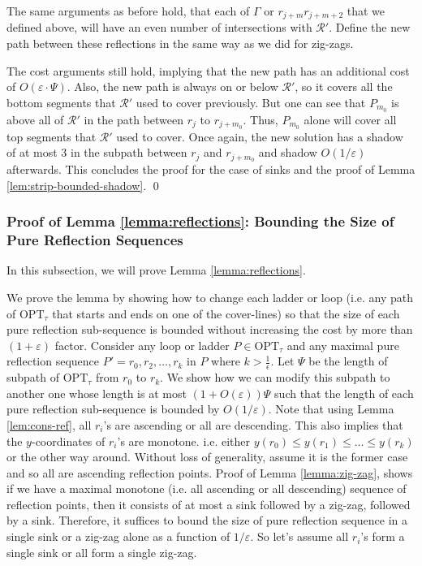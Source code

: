 \documentclass[10pt,a4paper]{amsart}
\theoremstyle{thmstyleone}
\newcommand{\eps}{\varepsilon}
\newcommand{\OPT}{{\text{OPT}}}
\begin{document}
    The same arguments as before hold, that each of $\Gamma$ or $r_{j+m}\left. r_{j + m + 2}\right.$ that we defined above, will have an even number of intersections with $\mathcal R'$. Define the new path between these reflections in
    the same way as we did for zig-zags.
	
    The cost arguments still hold, implying that the new path has an additional cost of $O(\eps\cdot\Psi)$. Also, the new path is always on or below $\mathcal R'$, so it covers all the bottom segments that $\mathcal R'$ used to cover previously. But one can see that $P_{m_0}$ is above all of $\mathcal R'$ in the path between $r_{j}$ to $r_{j + m_0}$. Thus, $P_{m_0}$ alone will cover all top segments that $\mathcal R'$ used to cover. Once again, the new solution has a shadow of at most $3$ in the subpath between $r_j$ and $r_{j+m_0}$ and shadow $O(1/\eps)$ afterwards.
    This concludes the proof for the case of sinks and the proof of 
    Lemma \ref{lem:strip-bounded-shadow}.
    \qed

\subsubsection{Proof of Lemma \ref{lemma:reflections}: Bounding the Size of Pure Reflection Sequences}\label{sec:lemma-pure-reflection-size}
In this subsection, we will prove Lemma \ref{lemma:reflections}. 

We prove the lemma by showing how to change each ladder or loop (i.e. any path of $\OPT_\tau$ that starts and ends on one of the cover-lines) so that the size of each pure reflection sub-sequence is bounded without increasing the cost by more than $(1+\eps)$ factor. Consider any loop or ladder $P\in \OPT_\tau$ and any maximal pure reflection sequence  $P'=r_0, r_2, \dots, r_k $ in $P$ where $k> \frac1\epsilon $. Let $\Psi$ be the length of subpath of $\OPT_\tau$ from $r_0$ to $r_k$.
We show how we can modify this subpath to another one whose length is at most $(1+O(\eps))\Psi$ such that the length  of each
pure reflection sub-sequence is bounded by $O(1/\eps)$.
Note that using Lemma \ref{lem:cons-ref},  all $r_i $'s are ascending or all are descending. 
This also implies that the $ y $-coordinates of $r_i$'s are monotone. i.e. either $ y(r_0)\le y(r_1)\le \dots \le y(r_k) $ or the other way around. Without loss of generality, assume it is the former case and so all are ascending reflection points.
Proof of Lemma \ref{lemma:zig-zag}, shows if we have a maximal monotone (i.e. all ascending or all descending) sequence of reflection points, then it consists of at most a sink followed by a zig-zag, followed by a sink. Therefore, it suffices to bound the size of pure reflection sequence in a single sink or a zig-zag alone as a function of $1/\eps$. So let's assume all $ r_i $'s form a single sink or all form a single zig-zag.
\end{document}
